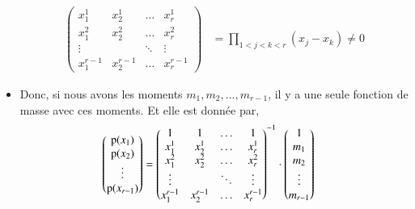 \begin{frame}
\begin{itemize}
\begin{align*}
\begin{pmatrix}
                x_1^1&x_2^1&\ldots&x_r^1\\
                x_1^2&x_2^2&\ldots&x_r^2\\
                \vdots&&\ddots&\vdots\\
                x_1^{r-1}&x_2^{r-1}&\ldots&x_r^{r-1}
             \end{pmatrix} 
             &= \prod_{1<j<k<r}(x_j-x_k) \neq 0
         \end{align*}
         \framebreak
         \item Donc, si nous avons les moments $m_1, m_2, \ldots, m_{r-1}$, il y a une seule fonction de masse avec ces moments.
         Et elle est donnée par,
         \begin{align*}
             \begin{pmatrix}
                \operatorname{p}(x_1)\\
                \operatorname{p}(x_2)\\
                \vdots\\
                \operatorname{p}(x_{r-1})
             \end{pmatrix}
             &=
             {
             \begin{pmatrix}
                1&1&\ldots&1\\
                x_1^1&x_2^1&\ldots&x_r^1\\
                x_1^2&x_2^2&\ldots&x_r^2\\
                \vdots&&\ddots&\vdots\\
                x_1^{r-1}&x_2^{r-1}&\ldots&x_r^{r-1}
             \end{pmatrix} }^{-1}
             \cdot
             \begin{pmatrix}
                1\\
                 m_1\\
                 m_2\\
                 \vdots\\
                 m_{r-1}
             \end{pmatrix}
         \end{align*}
    \end{itemize}
\end{frame}

